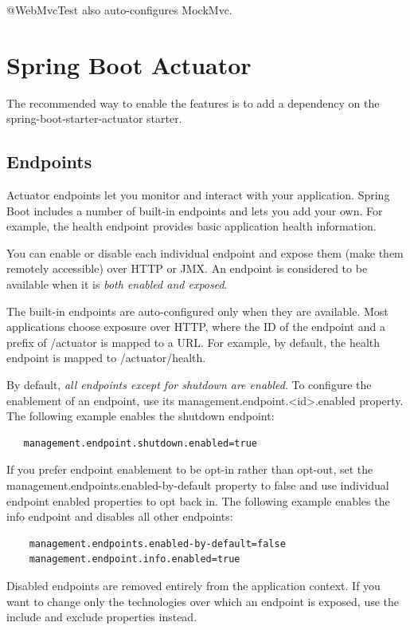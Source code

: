 \documentclass{scrartcl}
\begin{document}
@WebMvcTest also auto-configures MockMvc.


\section{Spring Boot Actuator}

The recommended way to enable the features is to add a dependency on the spring-boot-starter-actuator starter.

\subsection{Endpoints}

Actuator endpoints let you monitor and interact with your application. Spring Boot includes a number of built-in endpoints and lets you add your own. For example, the health endpoint provides basic application health information.

You can enable or disable each individual endpoint and expose them (make them remotely accessible) over HTTP or JMX. An endpoint is considered to be available when it is \textit{both enabled and exposed}.

The built-in endpoints are auto-configured only when they are available. Most applications choose exposure over HTTP, where the ID of the endpoint and a prefix of /actuator is mapped to a URL. For example, by default, the health endpoint is mapped to /actuator/health.

By default, \textit{all endpoints except for shutdown are enabled}. To configure the enablement of an endpoint, use its management.endpoint.<id>.enabled property. The following example enables the shutdown endpoint:

\begin{lstlisting}
   management.endpoint.shutdown.enabled=true
\end{lstlisting}

If you prefer endpoint enablement to be opt-in rather than opt-out, set the management.endpoints.enabled-by-default property to false and use individual endpoint enabled properties to opt back in. The following example enables the info endpoint and disables all other endpoints:

\begin{lstlisting}
    management.endpoints.enabled-by-default=false
    management.endpoint.info.enabled=true
\end{lstlisting}

Disabled endpoints are removed entirely from the application context. If you want to change only the technologies over which an endpoint is exposed, use the include and exclude properties instead.
\end{document}
